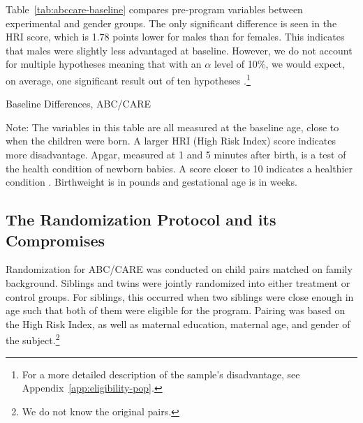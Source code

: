 Table~\ref{tab:abccare-baseline} compares pre-program variables between experimental and gender groups. The only significant difference is seen in the HRI score, which is 1.78 points lower for males than for females. This indicates that males were slightly less advantaged at baseline. However, we do not account for multiple hypotheses meaning that with an $\alpha$ level of 10\%, we would expect, on average, one significant result out of ten hypotheses \citep{Romano_Wolf_2005_JASA}.\footnote{For a more detailed description of the sample's disadvantage, see Appendix~\ref{app:eligibility-pop}.}

\begin{table}[H]
\centering
\caption{Baseline Differences, ABC/CARE}
\label{tab:abccare-baseline}
\begin{threeparttable}
	
\begin{tablenotes}
\footnotesize
\item Note: The variables in this table are all measured at the baseline age, close to when the children were born. A larger HRI (High Risk Index) score indicates more disadvantage. Apgar, measured at 1 and 5 minutes after birth, is a test of the health condition of newborn babies. A score closer to 10 indicates a healthier condition \citep{Apgar_1966_APGAR-Scoring_PCNA}. Birthweight is in pounds and gestational age is in weeks.
\end{tablenotes}
\end{threeparttable}
\end{table}


\subsection{The Randomization Protocol and its Compromises} \label{section:randomization}

Randomization for ABC/CARE was conducted on child pairs matched on family background. Siblings and twins were jointly randomized into either treatment or control groups. For siblings, this occurred when two siblings were close enough in age such that both of them were eligible for the program. Pairing was based on the High Risk Index, as well as maternal education, maternal age, and gender of the subject.\footnote{We do not know the original pairs.} 

